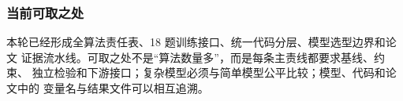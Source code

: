 \subsubsection{当前可取之处}

本轮已经形成全算法责任表、18 题训练接口、统一代码分层、模型选型边界和论文
证据流水线。可取之处不是“算法数量多”，而是每条主责线都要求基线、约束、
独立检验和下游接口；复杂模型必须与简单模型公平比较；模型、代码和论文中的
变量名与结果文件可以相互追溯。

